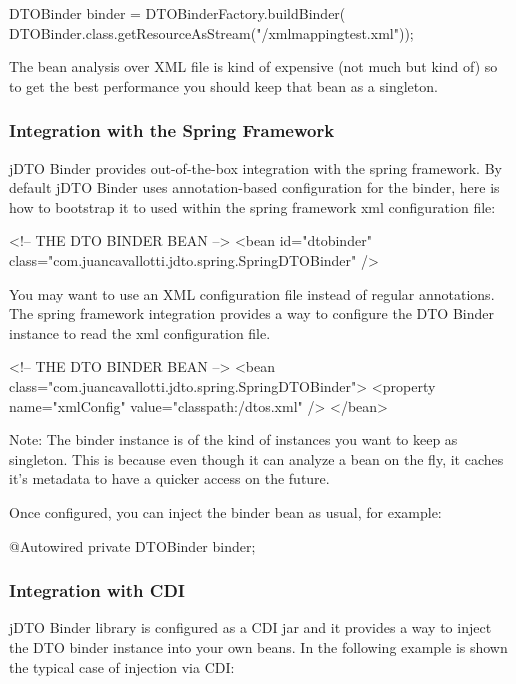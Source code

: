\documentclass[11pt]{article}
\newcommand{\JDTO}{jDTO Binder\xspace}
\begin{document}
\begin{java}
DTOBinder binder = DTOBinderFactory.buildBinder(
    DTOBinder.class.getResourceAsStream("/xmlmappingtest.xml"));
\end{java}

The bean analysis over XML file is kind of expensive (not much but kind of) so to get the best performance you should keep that bean as a singleton.

\subsubsection{Integration with the Spring Framework}

\JDTO provides out-of-the-box integration with the spring framework. By default \JDTO uses annotation-based configuration for the binder, here is how to bootstrap it to used within the spring framework xml configuration file:


\begin{xml}
<!-- THE DTO BINDER BEAN --> 
<bean id="dtobinder" 
    class="com.juancavallotti.jdto.spring.SpringDTOBinder" />
\end{xml}


You may want to use an XML configuration file instead of regular annotations. The spring framework integration
provides a way to configure the DTO Binder instance to read the xml configuration file.


\begin{xml}
<!-- THE DTO BINDER BEAN --> 
<bean class="com.juancavallotti.jdto.spring.SpringDTOBinder">
    <property name="xmlConfig" value="classpath:/dtos.xml" />
</bean>
\end{xml}


Note: The binder instance is of the kind of instances you want to keep as singleton. This is because even though it can analyze a bean on the fly, it caches it's metadata to have a quicker access on the future.

Once configured, you can inject the binder bean as usual, for example:


\begin{java}
@Autowired
private DTOBinder binder;
\end{java}

\subsubsection{Integration with CDI}

\JDTO library is configured as a CDI jar and it provides a way to inject the DTO binder instance into your own beans. In the following example is shown the typical case of injection via CDI:
\end{document}
